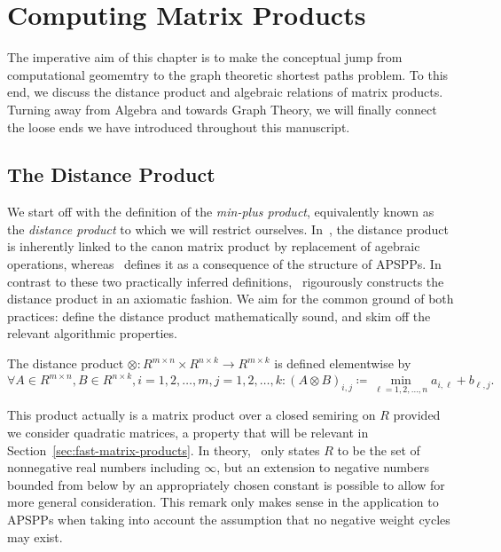 \chapter{Computing Matrix Products}

The imperative aim of this chapter is to make the conceptual jump from computational geomemtry to the graph theoretic shortest paths problem.
To this end, we discuss the distance product and algebraic relations of matrix products.
Turning away from Algebra and towards Graph Theory, we will finally connect the loose ends we have introduced throughout this manuscript.

\section{The Distance Product}\label{sec:dist-prod}


We start off with the definition of the \emph{min-plus product}, equivalently known as the \emph{distance product} to which we will restrict ourselves.
In~\cite[Chapter~25]{Cormen2001}, the distance product is inherently linked to the canon matrix product by replacement of agebraic operations, whereas~\cite{Chan2007} defines it as a consequence of the structure of APSPPs.
In contrast to these two practically inferred definitions,\ \cite[Section~5.6]{Aho1974} rigourously constructs the distance product in an axiomatic fashion.
We aim for the common ground of both practices: define the distance product mathematically sound, and skim off the relevant algorithmic properties.

\begin{definition}\label{def:distance-product}
    The distance product $\otimes: R^{m \times n} \times R^{n \times k} \rightarrow R^{m \times k}$ is defined elementwise by
    \[
        \forall A \in R^{m \times n}, B \in R^{n \times k}, i = 1, 2, \dots, m, j = 1, 2, \dots, k: {\left( A \otimes B \right)}_{i, j} \coloneqq \min\limits_{\ell = 1, 2, \dots, n} a_{i, \ell} + b_{\ell, j}.
    \]
\end{definition}

This product actually is a matrix product over a closed semiring on $R$ provided we consider quadratic matrices, a property that will be relevant in Section~\ref{sec:fast-matrix-products}.
In theory,\ \cite[Example~5.9]{Aho1974} only states $R$ to be the set of nonnegative real numbers including $\infty$, but an extension to negative numbers bounded from below by an appropriately chosen constant is possible to allow for more general consideration.
This remark only makes sense in the application to APSPPs when taking into account the assumption that no negative weight cycles may exist.

